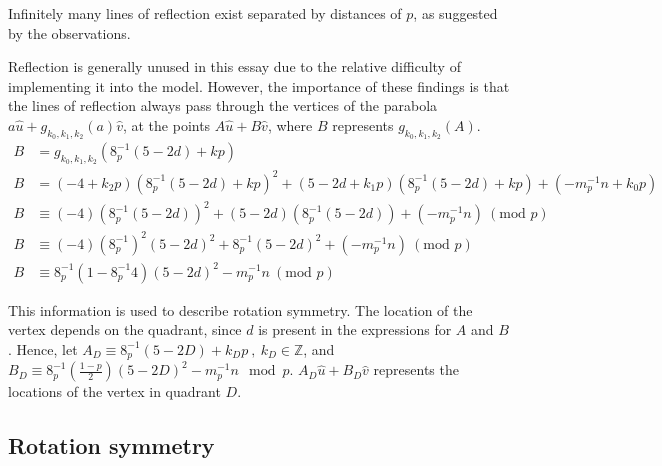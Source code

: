 \documentclass{article}
\begin{document}
Infinitely many lines of reflection exist separated by distances of \(p\), as suggested by the observations.

Reflection is generally unused in this essay due to the relative difficulty of implementing it into the model. However, the importance of these findings is that the lines of reflection always pass through the vertices of the parabola \(a\hat{u}+g_{k_0,k_1,k_2}(a)\hat{v}\), at the points \(A\hat{u}+B\hat{v}\), where \(B\) represents \(g_{k_0,k_1,k_2}(A)\).
\begin{align}
	\nonumber B &= g_{k_0,k_1,k_2}(8^{-1}_p(5 - 2d) + kp) \\
	\nonumber B &= (-4+k_2p)(8^{-1}_p(5 - 2d) + kp)^2 + (5-2d+k_1p)(8^{-1}_p(5 - 2d) + kp) + (-m^{-1}_pn+k_0p) \\
	\nonumber B &\equiv (-4)(8^{-1}_p(5 - 2d))^2 + (5-2d)(8^{-1}_p(5 - 2d)) + (-m^{-1}_pn)\ (\text{mod }p) \\
	\nonumber B &\equiv (-4)(8^{-1}_p)^2(5 - 2d)^2 + 8^{-1}_p(5 - 2d)^2 + (-m^{-1}_pn)\ (\text{mod }p) \\
	\nonumber B &\equiv 8^{-1}_p(1-8^{-1}_p4)(5 - 2d)^2 - m^{-1}_pn\ (\text{mod }p)
\end{align}

This information is used to describe rotation symmetry. The location of the vertex depends on the quadrant, since \(d\) is present in the expressions for \(A\) and \(B\). Hence, let \(A_D \equiv 8^{-1}_p(5 - 2D) + k_Dp\ ,\ k_D \in \mathbb{Z}\), and \(B_D \equiv 8^{-1}_p\left(\frac{1-p}{2}\right)(5 - 2D)^2 - m^{-1}_pn \mod p\). \(A_D\hat{u}+B_D\hat{v}\) represents the locations of the vertex in quadrant \(D\).



\subsection{Rotation symmetry}
\end{document}
